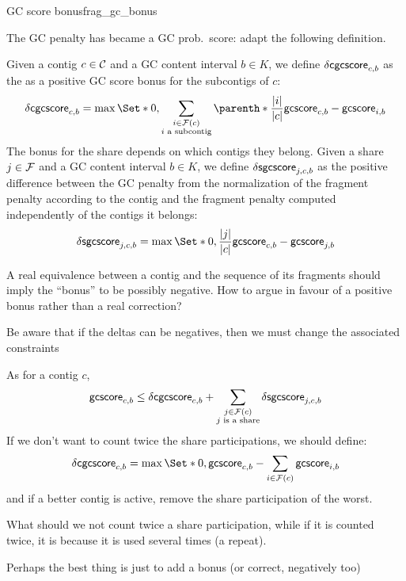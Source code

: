 \begin{definition}{GC score bonus}{frag_gc_bonus}
  \begin{fixmebox}
    The GC penalty has became a GC prob.\ score: adapt the following definition.
  \end{fixmebox}
  Given a contig \(c \in \mathcal{C}{}\) and a GC content interval \(b \in K\), we define \(\mathsf{\delta cgcscore}_{c, b}\) as the as a positive GC score bonus for the subcontigs of \(c\):
  \[
    \dcgcscore{c}{b} = \max \Set*{
      0,
      \sum_{\substack{
          i \in \Fragments{}(c) \\ i \text{ a subcontig}
      }}
      \parenth*{
        \frac{|i|}{|c|}\gcscore{c}{b} - \gcscore{i}{b}
      }
    }
  \]
  The bonus for the share depends on which contigs they belong.
  Given a share \(j \in \mathcal{F}{}\) and a GC content interval \(b \in K\), we define \(\mathsf{\delta sgcscore}_{j, c, b}\) as the positive difference between the GC penalty from the normalization of the fragment penalty according to the contig and the fragment penalty computed independently of the contigs it belongs:
  \[
    \dsgcscore{j}{c}{b} = \max \Set*{
      0,
      \frac{|j|}{|c|} \gcscore{c}{b} - \gcscore{j}{b}
    }
  \]
  \begin{questionbox}
    A real equivalence between a contig and the sequence of its fragments should imply the \enquote{bonus} to be possibly negative.
    How to argue in favour of a positive bonus rather than a real correction?

    Be aware that if the deltas can be negatives, then we must change the associated constraints
  \end{questionbox}
\end{definition}

\begin{ideabox}
  As for a contig \(c\),
  \[
    \mathsf{gcscore}_{c, b} \leq \mathsf{\delta cgcscore}_{c, b} + \sum_{\substack{
        j \in \mathcal{F}{}(c) \\
        j \text{ is a share}
    }}\mathsf{\delta sgcscore}_{j, c, b}
  \]
  If we don't want to count twice the share participations, we should define:
  \[
    \dcgcscore{c}{b} = \max \Set*{
      0,
      \gcscore{c}{b} - \sum_{i \in \Fragments{}(c)} \gcscore{i}{b}
    }
  \]
  and if a better contig is active, remove the share participation of the worst.

  \begin{questionbox}
    What should we not count twice a share participation, while if it is counted twice, it is because it is used several times (a repeat).

    Perhaps the best thing is just to add a bonus (or correct, negatively too)
  \end{questionbox}
\end{ideabox}

